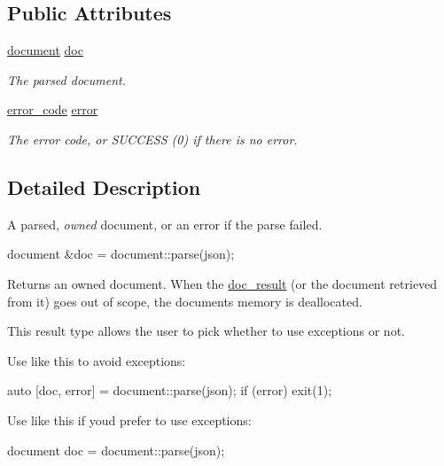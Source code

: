 \subsection*{Public Attributes}
\begin{DoxyCompactItemize}
\item 
\hyperlink{classsimdjson_1_1document}{document} \hyperlink{classsimdjson_1_1document_1_1doc__result_ad12726cc5708b5af4684795344a5fce4}{doc}
\begin{DoxyCompactList}\small\item\em The parsed document. \end{DoxyCompactList}\item 
\mbox{\label{classsimdjson_1_1document_1_1doc__result_aed27563b2adca42b5e10416cc1cbe2c7}} 
\hyperlink{namespacesimdjson_a7b735a3a50ba79e3f7f14df5f77d8da9}{error\+\_\+code} \hyperlink{classsimdjson_1_1document_1_1doc__result_aed27563b2adca42b5e10416cc1cbe2c7}{error}
\begin{DoxyCompactList}\small\item\em The error code, or S\+U\+C\+C\+E\+SS (0) if there is no error. \end{DoxyCompactList}\end{DoxyCompactItemize}


\subsection{Detailed Description}
A parsed, {\itshape owned} document, or an error if the parse failed. 

document \&doc = document\+::parse(json);

Returns an owned {\ttfamily document}. When the \hyperlink{classsimdjson_1_1document_1_1doc__result}{doc\+\_\+result} (or the document retrieved from it) goes out of scope, the document\textquotesingle{}s memory is deallocated.

This result type allows the user to pick whether to use exceptions or not.

Use like this to avoid exceptions\+: \begin{DoxyVerb}auto [doc, error] = document::parse(json);
if (error) { exit(1); }
\end{DoxyVerb}


Use like this if you\textquotesingle{}d prefer to use exceptions\+: \begin{DoxyVerb}document doc = document::parse(json);\end{DoxyVerb}
 

